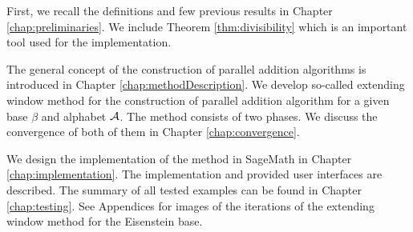 First, we recall the definitions and few previous results in Chapter \ref{chap:preliminaries}. We include Theorem \ref {thm:divisibility} which is an important tool used for the implementation. 

The general concept of the construction of parallel addition algorithms is introduced in Chapter \ref{chap:methodDescription}. We develop so-called extending window method for the construction of parallel addition algorithm for a given base $\beta$ and alphabet $\mathcal{A}$. The method consists of two phases. We discuss the convergence of both of them in Chapter \ref{chap:convergence}.

We design the implementation of the method in SageMath in Chapter \ref{chap:implementation}. The implementation and provided user interfaces are described. The summary of all tested examples can be found in Chapter \ref{chap:testing}. See Appendices for images of the iterations of the extending window method for the Eisenstein base.














